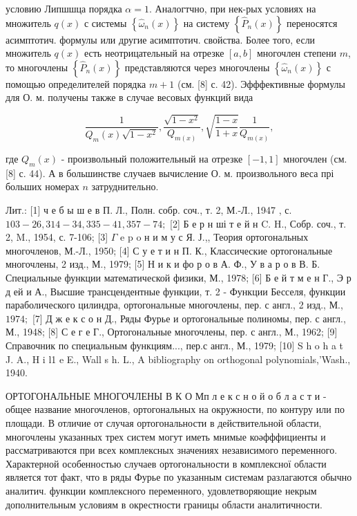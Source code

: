 \documentclass[10pt]{article}
\begin{document}
условию Липшшца порядка $\alpha=1$. Аналогтчно, при нек-рых условиях на множитель $q(x)$ с системы $\left\{\hat{\omega}_{n}(x)\right\}$ на систему $\left\{\hat{P}_{n}(x)\right\}$ переносятся асимптотич. формулы или другие асимптотич. свойства. Более того, если множитель $q(x)$ есть неотрицательный на отрезке $[a, b]$ многочлен степени $m$, то многочлены $\left\{\hat{P}_{n}(x)\right\}$ представляются через многочлены $\left\{\hat{\omega}_{n}(x)\right\}$ с помощью определителей порядка $m+1$ (см. [8] с. 42). Эфффективные формулы для О. м. получены также в случае весовых функций вида



\[

\frac{1}{Q_{m}(x) \sqrt{1-x^{2}}}, \frac{\sqrt{1-x^{2}}}{Q_{m(x)}}, \sqrt{\frac{1-x}{1+x}} \frac{1}{Q_{m(x)}},

\]



где $Q_{m}(x)$ - произвольный положительный на отрезке $[-1,1]$ многочлен (см. [8] с. 44). А в большинстве случаев вычисление О. м. произвольного веса прі больших номерах $n$ затруднительно.



Лит.: [1] ч е б ы ш е в П. Л., Полн. собр. соч., т. 2, М.-Л., 1947 , с. $103-26,314-34,335-41,357-74 ;$ [2] Б е р н ші т е й н C. H., Собр. соч., т. 2, M., 1954, с. 7-106; [3] $\Gamma$ e p o н и м у с Я. Ј.,, Теория ортогональных многочленов, М.-Л., 1950; [4] С у е т и н П. К., Классические ортогональные многочлены, 2 изд., М., 1979; [5] Н и к и фо р о в А. Ф., У в а р о в В. Б. Специальные функции математической физики, М., 1978; [6] Б е й т м е н Г., Э р д ей и А., Высшие трансцендентные функции, т. 2 - Функции Бесселя, функции параболического цилиндра, ортогональные многочлены, пер. с англ., 2 изд., М., $1974 ;$ [7] Д ж е к с о н Д., Ряды Фурье и ортогональные полиномы, пер. с англ., М., 1948; [8] С е г е Г., Ортогональные многочлены, пер. с англ., М., 1962; [9] Справочник по специальным функциям..., пер.с англ., М., 1979; [10] S h o h a t J. A., H i l1 e E., Wall s $\mathrm{h}$. L., A bibliography on orthogonal polynomials,'Wash., 1940.



ОРТОГОНАЛЬНЫЕ МНОГОЧЛЕНЫ В К О Мп л е к с н о й о б л а с т и - общее название многочленов, ортогональных на окружности, по контуру или по площади. В отличие от случая ортогональности в действительной области, многочлены указанных трех систем могут иметь мнимые коәфффициенты и рассматриваются при всех комплексных значениях независимого переменного. Характерной особенностью случаев ортогональности в комплексної области является тот факт, что в ряды Фурье по указанным системам разлагаются обычно аналитич. функции комплексного переменного, удовлетворяющие некрым дополнительным условиям в окрестности границы области аналитичности.
\end{document}
